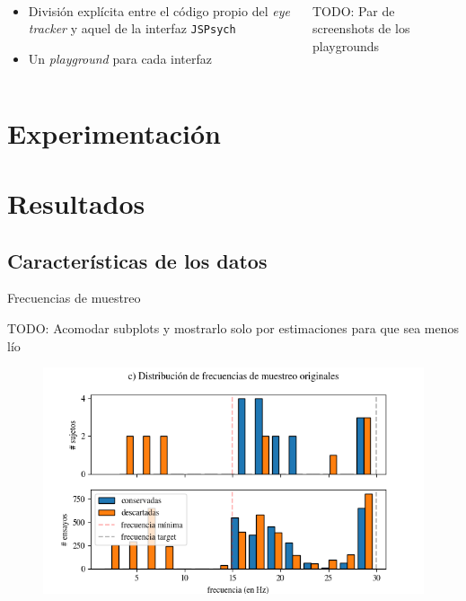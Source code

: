 \documentclass[aspectratio=169]{beamer}
\begin{document}
\begin{frame}{~}
  \begin{columns}
    \begin{column}{.5\textwidth}
      \begin{itemize}
        \item División explícita entre el código propio del \textit{eye
          tracker} y aquel de la interfaz \texttt{JSPsych}

        \item Un \textit{playground} para cada interfaz
      \end{itemize}
    \end{column}

    \begin{column}{.5\textwidth}
      TODO: Par de screenshots de los playgrounds
    \end{column}
  \end{columns}

\end{frame}

\section{Experimentación}


\section{Resultados}

\subsection{Características de los datos}

\begin{frame}{Frecuencias de muestreo}

  TODO: Acomodar subplots y mostrarlo solo por estimaciones para que sea menos
  lío
  \begin{figure}
    \includegraphics[width=0.7\linewidth]{img/second-sampling-frequencies-distribution.png}
  \end{figure}

\end{frame}
\end{document}
